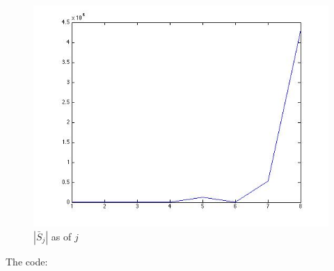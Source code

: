 \documentclass{article}
\begin{document}
\begin{figure}[H]
\centering
\includegraphics[scale=0.5]{q4c-si.jpg}
\caption{ $|\bar S_j|$ as of $j$}
\label{}
\end{figure}

The code:
\end{document}
